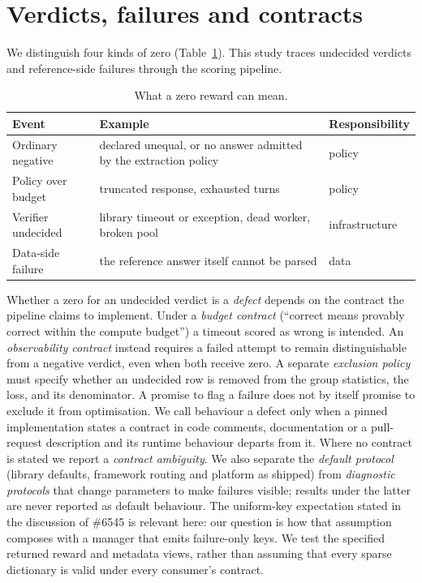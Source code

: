 \documentclass[10pt,a4paper]{article}
\let\cite\citep
\begin{document}
\section{Verdicts, failures and contracts}
\label{sec:contracts}

We distinguish four kinds of zero (Table~\ref{tab:events}). This study traces
undecided verdicts and reference-side failures through the scoring pipeline.

\begin{table}[h]
\centering
\caption{What a zero reward can mean.}
\label{tab:events}
\small
\begin{tabular}{@{}p{3.4cm}p{6.3cm}l@{}}
\toprule
Event & Example & Responsibility \\
\midrule
Ordinary negative & declared unequal, or no answer admitted by the extraction policy & policy \\
Policy over budget & truncated response, exhausted turns & policy \\
Verifier undecided & library timeout or exception, dead worker, broken pool & infrastructure \\
Data-side failure & the reference answer itself cannot be parsed & data \\
\bottomrule
\end{tabular}
\end{table}

Whether a zero for an undecided verdict is a \emph{defect} depends on the
contract the pipeline claims to implement. Under a \emph{budget contract}
(``correct means provably correct within the compute budget'') a timeout
scored as wrong is intended. An \emph{observability contract} instead
requires a failed attempt to remain distinguishable from a negative verdict,
even when both receive zero. A separate \emph{exclusion policy} must specify
whether an undecided row is removed from the group statistics, the loss,
and its denominator. A promise to flag a failure does not by itself promise
to exclude it from optimisation. We call
behaviour a defect only when a pinned implementation states a contract in
code comments, documentation or a pull-request description and its runtime
behaviour departs from it. Where no contract is stated we report a
\emph{contract ambiguity}. We also separate the \emph{default protocol}
(library defaults, framework routing and platform as shipped) from
\emph{diagnostic protocols} that change parameters to make failures visible;
results under the latter are never reported as default behaviour.
The uniform-key expectation stated in the discussion of \#6545
\cite{verl6545} is relevant here: our question is how that assumption
composes with a manager that emits failure-only keys. We test the
specified returned reward and metadata views, rather than assuming that
every sparse dictionary is valid under every consumer's contract.
\end{document}
